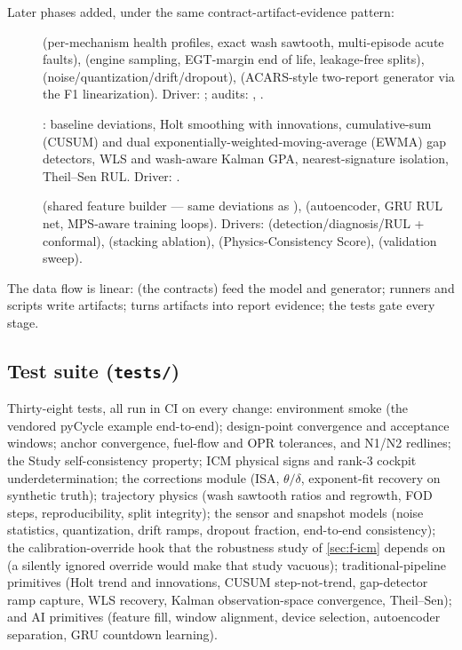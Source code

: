 Later phases added, under the same contract-artifact-evidence pattern:
\begin{description}
  \item[]  (per-mechanism health profiles, exact wash
    sawtooth, multi-episode acute faults),  (engine sampling, EGT-margin end
    of life, leakage-free splits),  (noise/quantization/drift/dropout),
     (ACARS-style two-report generator via the F1 linearization).
    Driver: ; audits: ,
    .
  \item[] : baseline deviations, Holt smoothing with
    innovations, cumulative-sum (CUSUM) and dual exponentially-weighted-moving-average (EWMA)
    gap detectors, WLS and wash-aware Kalman GPA,
    nearest-signature isolation, Theil--Sen RUL. Driver: .
  \item[]  (shared feature builder --- same deviations as
    ),  (autoencoder, GRU RUL net, MPS-aware training loops).
    Drivers:  (detection/diagnosis/RUL + conformal),
     (stacking ablation),  (Physics-Consistency
    Score),  (validation sweep).
\end{description}

The data flow is linear:  (the contracts) feed the model and generator;
runners and  scripts write  artifacts;
 turns artifacts into report evidence; the tests gate every
stage.

\subsection{Test suite (\texttt{tests/})}

Thirty-eight tests, all run in CI on every change: environment smoke (the vendored pyCycle
example end-to-end); design-point convergence and acceptance windows; anchor convergence,
fuel-flow and OPR tolerances, and N1/N2 redlines; the Study self-consistency property; ICM
physical signs and rank-3 cockpit underdetermination; the corrections module (ISA,
$\theta/\delta$, exponent-fit recovery on synthetic truth); trajectory physics (wash
sawtooth ratios and regrowth, FOD steps, reproducibility, split integrity); the sensor and
snapshot models (noise statistics, quantization, drift ramps, dropout fraction, end-to-end
consistency); the calibration-override hook that the robustness study of \cref{sec:f-icm}
depends on (a silently ignored override would make that study vacuous);
traditional-pipeline primitives (Holt trend and innovations, CUSUM
step-not-trend, gap-detector ramp capture, WLS recovery, Kalman observation-space
convergence, Theil--Sen); and AI primitives (feature fill, window alignment, device
selection, autoencoder separation, GRU countdown learning).

